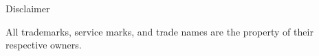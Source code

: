 \begin{frame}{Disclaimer}
\begin{center}
All trademarks, service marks, and trade names are the property of their respective owners.
\end{center}
\end{frame}

